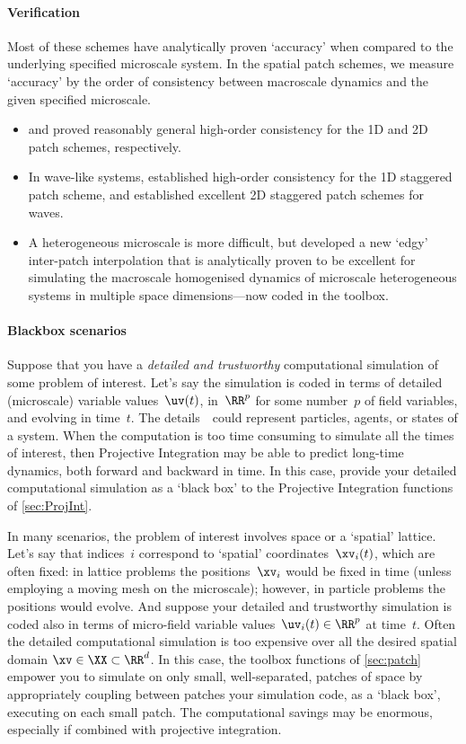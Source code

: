 \paragraph{Verification}
Most of these schemes have analytically proven `accuracy' when compared to the underlying specified microscale system.
In the spatial patch schemes, we measure `accuracy' by the order of consistency between macroscale dynamics and the given specified microscale.  
\begin{itemize}
\item \cite{Roberts06d} and \cite{Roberts2011a} proved reasonably general high-order consistency for the 1D and 2D patch schemes, respectively.
\item In wave-like systems, \cite{Cao2014a} established high-order consistency for the 1D staggered patch scheme, and \cite{Divahar2022b, Bunder2019d} established excellent 2D staggered patch schemes for waves.
\item A heterogeneous microscale is more difficult, but \cite{Bunder2020a, Bunder2022b} developed a new `edgy' inter-patch interpolation that is analytically proven to be excellent for simulating the macroscale homogenised dynamics of microscale heterogeneous systems in multiple space dimensions---now coded in the toolbox.
\end{itemize}



\paragraph{Blackbox scenarios} 
Suppose that you have a \emph{detailed and trustworthy} computational simulation of some problem of interest.
Let's say the simulation is coded in terms of detailed (microscale) variable values~\(\uv(t)\), in~\(\RR^{p}\) for some number~\(p\) of field variables, and evolving in time~\(t\).
The details~\uv\ could represent particles, agents, or states of a system.
When the computation is too time consuming to simulate all the times of interest, then Projective Integration may be able to predict long-time dynamics, both forward and backward in time.  
In this case, provide your detailed computational simulation as a `black box' to the Projective Integration functions of \cref{sec:ProjInt}.

In many scenarios, the problem of interest involves space or a `spatial' lattice.
Let's say that indices~\(i\) correspond to `spatial' coordinates~\(\xv_i(t)\), which are often fixed: in lattice problems the positions~\(\xv_i\) would be fixed in time (unless employing a moving mesh on the microscale); however, in particle problems the positions would evolve.
And suppose your detailed and trustworthy simulation is coded also in terms of micro-field variable values~\(\uv_i(t)\in\RR^p\) at time~\(t\).
Often the detailed computational simulation is too expensive over all the desired spatial domain \(\xv\in\XX\subset\RR^{d}\).
In this case, the toolbox functions of \cref{sec:patch} empower you to simulate on only small, well-separated, patches of space by appropriately coupling between patches your simulation code, as a `black box', executing on each small patch. 
The computational savings may be enormous, especially if combined with projective integration.


